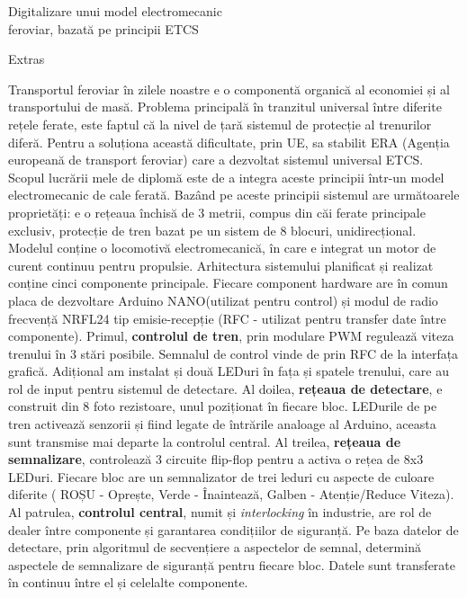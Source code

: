 \documentclass[a4paper,12pt]{article}
\begin{document}
\newpage
\pagestyle{empty}
\begin{center}
		{\huge Digitalizare unui model electromecanic }\\\vspace{0.15in}
		{\huge feroviar, bazată pe principii ETCS}
	\vspace{0.1in}
	
    {\LARGE Extras}
\end{center}

Transportul feroviar în zilele noastre e o componentă organică al economiei și al transportului de masă.
Problema principală în tranzitul universal între diferite rețele ferate, este faptul că la nivel de țară sistemul de protecție al trenurilor diferă.
Pentru a soluționa această dificultate, prin UE, sa stabilit ERA (Agenția europeană de transport feroviar) care a dezvoltat sistemul universal ETCS.
Scopul lucrării mele de diplomă este de a integra aceste principii într-un model electromecanic de cale ferată. 
Bazând pe aceste principii sistemul are următoarele proprietăți: e o rețeaua închisă de 3 metrii, compus din căi ferate principale exclusiv, protecție de tren bazat pe un sistem de 8 blocuri, unidirecțional.
Modelul conține o locomotivă electromecanică, în care e integrat un motor de curent continuu pentru propulsie.
Arhitectura sistemului planificat și realizat conține cinci componente principale. 
Fiecare component hardware are în comun placa de dezvoltare Arduino NANO(utilizat pentru control) și modul de radio frecvență NRFL24 tip emisie-recepție (RFC - utilizat pentru transfer date între componente).
Primul, \textbf{controlul de tren}, prin modulare PWM regulează viteza trenului în 3 stări posibile. Semnalul de control vinde de prin RFC de la interfața grafică.
Adițional am instalat și două LEDuri în fața și spatele trenului, care au rol de input pentru sistemul de detectare.
Al doilea, \textbf{rețeaua de detectare}, e construit din 8 foto rezistoare, unul poziționat în fiecare bloc. LEDurile de pe tren activează senzorii și fiind legate de întrările analoage al Arduino, aceasta sunt transmise mai departe la controlul central.
Al treilea, \textbf{rețeaua de semnalizare}, controlează 3 circuite flip-flop pentru a activa o rețea de 8x3 LEDuri. Fiecare bloc are un semnalizator de trei leduri cu aspecte de culoare diferite ( ROȘU - Oprește, Verde - Înaintează, Galben - Atenție/Reduce Viteza).
Al patrulea, \textbf{controlul central}, numit și \textit{interlocking} în industrie, are rol de dealer între componente și garantarea condițiilor de siguranță. 
Pe baza datelor de detectare, prin algoritmul de secvențiere a aspectelor de semnal, determină aspectele de semnalizare de siguranță pentru fiecare bloc. Datele sunt transferate în continuu între el și celelalte componente.
\end{document}
